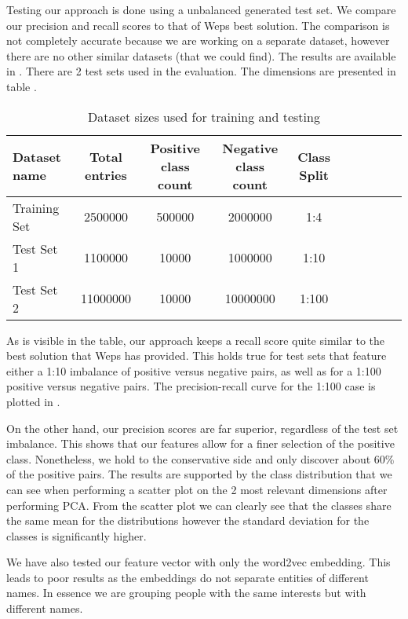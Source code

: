Testing our approach is done using a unbalanced generated test set. We compare
our precision and recall scores to that of Weps best solution. The comparison
is not completely accurate because we are working on a separate dataset, however
there are no other similar datasets (that we could find). The results are available
in . There are 2 test sets used in the
evaluation. The dimensions are presented in table .

\begin{center}
\begin{table}[htb]
  \caption{Dataset sizes used for training and testing}
  \begin{tabular}{l*{8}{c}r}
    \textbf {Dataset name} & \textbf{Total entries} & \textbf{Positive class count} & \textbf{Negative class count} & \textbf{Class Split} \\
    \hline
    Training Set   & 2500000 & 500000 & 2000000 & 1:4\\
    Test Set 1     & 1100000 &  10000  & 1000000 & 1:10\\
    Test Set 2     & 11000000 & 10000  & 10000000 & 1:100\\
  \end{tabular}
  \label{table:datasets}
\end{table}
\end{center}


As is visible in the table, our approach
keeps a recall score quite similar to the best solution that Weps has provided.
This holds true for test sets that feature either a 1:10 imbalance of positive
versus negative pairs, as well as for a 1:100 positive versus negative pairs.
The precision-recall curve for the 1:100 case is plotted in
.

On the other hand, our precision scores are far superior, regardless of the test
set imbalance. This shows that our features allow for a finer selection
of the positive class. Nonetheless, we hold to the conservative side and only
discover about 60\% of the positive pairs. The results are supported by the
class distribution that we can see when performing a scatter plot on the 2
most relevant dimensions after performing PCA. 
From the scatter plot we can clearly see that the classes share the same mean for
the distributions however the standard deviation for the classes is significantly higher.

We have also tested our feature vector with only the word2vec embedding. This leads to
poor results as the embeddings do not separate entities of different names. In essence
we are grouping people with the same interests but with different names.

